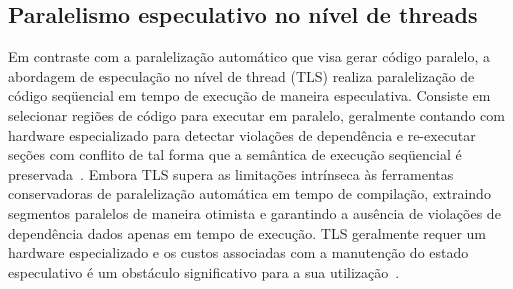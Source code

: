 \documentclass[a4paper,12pt]{article}
\begin{document}

\subsection{Paralelismo especulativo no nível de threads}

Em contraste com a paralelização automático que visa gerar código paralelo, a abordagem de especulação no nível de thread (TLS) realiza paralelização de código seqüencial em tempo de execução de maneira especulativa. Consiste em selecionar regiões de código para executar em paralelo, geralmente contando com hardware especializado para detectar violações de dependência e re-executar seções com conflito de tal forma que a semântica de execução seqüencial é preservada~\cite{hammond98,chen03,wu08}. Embora TLS supera as limitações intrínseca às ferramentas conservadoras de paralelização automática em tempo de compilação, extraindo segmentos paralelos de maneira otimista e garantindo a ausência de violações de dependência dados apenas em tempo de execução. TLS geralmente requer um hardware especializado e os custos associadas com a manutenção do estado especulativo é um obstáculo significativo para a sua utilização~\cite{yiapanis13}.

\end{document}
